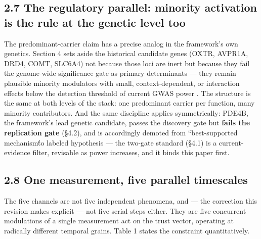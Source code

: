 \documentclass[
]{article}
\begin{document}
\subsection{2.7 The regulatory parallel: minority activation is the rule
at the genetic level
too}\label{the-regulatory-parallel-minority-activation-is-the-rule-at-the-genetic-level-too}

The predominant-carrier claim has a precise analog in the framework's
own genetics. Section 4 sets aside the historical candidate genes (OXTR,
AVPR1A, DRD4, COMT, SLC6A4) not because those loci are inert but because
they fail the genome-wide significance gate as primary determinants ---
they remain plausible minority modulators with small, context-dependent,
or interaction effects below the detection threshold of current GWAS
power . The structure is the same at both levels of the stack: one
predominant carrier per function, many minority contributors. And the
same discipline applies symmetrically: PDE4B, the framework's lead
genetic candidate, passes the discovery gate but \textbf{fails the
replication gate} (§4.2), and is accordingly demoted from
``best-supported mechanismt́́o labeled hypothesis --- the two-gate
standard (§4.1) is a current-evidence filter, revisable as power
increases, and it binds this paper first.

\subsection{2.8 One measurement, five parallel
timescales}\label{one-measurement-five-parallel-timescales}

The five channels are not five independent phenomena, and --- the
correction this revision makes explicit --- not five serial steps
either. They are five concurrent modulations of a single measurement act
on the trust vector, operating at radically different temporal grains.
Table 1 states the constraint quantitatively.
\end{document}
